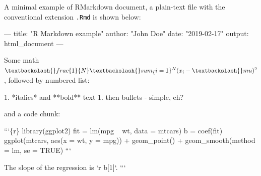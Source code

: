 \documentclass[conference,final,a4paper,]{IEEEtran}
\newenvironment{Shaded}{\begin{snugshade}}{\end{snugshade}}
\newcommand{\BaseNTok}[1]{\textcolor[rgb]{0.00,0.00,0.81}{#1}}
\newcommand{\FloatTok}[1]{\textcolor[rgb]{0.00,0.00,0.81}{#1}}
\newcommand{\StringTok}[1]{\textcolor[rgb]{0.31,0.60,0.02}{#1}}
\newcommand{\OtherTok}[1]{\textcolor[rgb]{0.56,0.35,0.01}{#1}}
\newcommand{\FunctionTok}[1]{\textcolor[rgb]{0.00,0.00,0.00}{#1}}
\newcommand{\AttributeTok}[1]{\textcolor[rgb]{0.77,0.63,0.00}{#1}}
\newcommand{\NormalTok}[1]{#1}
\begin{document}
A minimal example of RMarkdown document, a plain-text file with the
conventional extension \texttt{.Rmd} is shown below:

\footnotesize

\begin{Shaded}
\begin{Highlighting}[]
\OtherTok{---}
\FunctionTok{title:}\AttributeTok{ }\StringTok{"R Markdown example"}
\FunctionTok{author:}\AttributeTok{ }\StringTok{"John Doe"}
\FunctionTok{date:}\AttributeTok{ }\StringTok{"2019-02-17"}
\FunctionTok{output:}\AttributeTok{ html_document}
\OtherTok{---}
\end{Highlighting}
\end{Shaded}

\begin{Shaded}
\begin{Highlighting}[]
\NormalTok{Some math }
\NormalTok{$\textbackslash{}frac\{1\}\{N\} \textbackslash{}sum_\{i=1\}^N (x_i -\textbackslash{}mu)^2$,}
\NormalTok{followed by numbered list:}
  
\NormalTok{1. }\FloatTok{*italics* and **bold** text}
\FloatTok{1. then bullets}
\FloatTok{    - simple, eh?}

\NormalTok{and a code chunk:}

\NormalTok{```\{r\}}
\NormalTok{library(ggplot2)}
\NormalTok{fit = lm(mpg ~ wt, data = mtcars)}
\NormalTok{b   = coef(fit)}
\NormalTok{ggplot(mtcars, aes(x = wt, y = mpg)) +}
\NormalTok{  geom_point() + }
\NormalTok{  geom_smooth(method = lm, se = TRUE)}
\NormalTok{```}

\NormalTok{The slope of the regression is }\BaseNTok{`r b[1]`}\NormalTok{.}
\NormalTok{```}
\end{Highlighting}
\end{Shaded}

\normalsize
\end{document}
